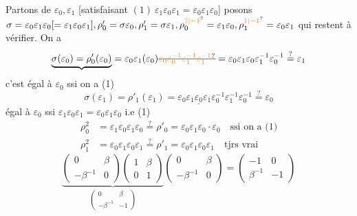 {Partons de $\varepsilon_0,\varepsilon_1$ [satisfaisant $(1)\ \boxed{\varepsilon_1\varepsilon_0\varepsilon_1=\varepsilon_0\varepsilon_1\varepsilon_0}$]
posons $\sigma=\varepsilon_0\varepsilon_1\varepsilon_0[=\varepsilon_1\varepsilon_0\varepsilon_1],\rho'_0=\sigma \varepsilon_0,\rho'_1=\sigma \varepsilon_1,\rho_0^{\unsure{?|-1}}=\varepsilon_1\varepsilon_0,\rho_1^{\unsure{1|-1}}=\varepsilon_0\varepsilon_1$
   qui restent à vérifier. On a
\[\underbrace{\sigma(\varepsilon_0)=\rho'_0(\varepsilon_0)}=\varepsilon_0\varepsilon_1(\varepsilon_0)\deleted{\unsure{\varepsilon_0\varepsilon_0^{-1}\varepsilon_1^{-1}\varepsilon_1^{-1}}}=\varepsilon_0\varepsilon_1\varepsilon_0\varepsilon_1^{-1}\varepsilon_0^{-1}\stackrel{?}{=}\varepsilon_1\]
c'est égal à $\varepsilon_0$ ssi  on a (1)
\[\sigma(\varepsilon_1)=\rho'_1(\varepsilon_1)=\varepsilon_0\underline{\varepsilon_1\varepsilon_0\varepsilon_1}\varepsilon_0^{-1}\varepsilon_1^{-1}\varepsilon_0^{-1}\stackrel{?}{=}\varepsilon_0\]
égal à $\varepsilon_0$ ssi $\varepsilon_1\varepsilon_0\varepsilon_1=\varepsilon_0\varepsilon_1\varepsilon_0$ i.e (1)}
\[\begin{aligned}
\rho_0^2&=\varepsilon_1\varepsilon_0\varepsilon_1\varepsilon_0\stackrel{?}{=}\rho'_0=\varepsilon_0\varepsilon_1\varepsilon_0\mathbin{\cdot}\varepsilon_0\quad\text{ssi on a (1)}\\
\rho_1^2&=\varepsilon_0\varepsilon_1\varepsilon_0\varepsilon_1\stackrel{?}{=}\rho'_1=\varepsilon_0\varepsilon_1\varepsilon_0\varepsilon_1\quad\text{tjrs vrai}
\end{aligned}\]
\[\underbrace{\begin{pmatrix}0&\beta\\-\beta^{-1}&0\end{pmatrix}\begin{pmatrix}1&\beta\\0&1\end{pmatrix}}_{\begin{pmatrix}0&\beta\\-\beta^{-1}&-1\end{pmatrix}}\begin{pmatrix}0&\beta\\-\beta^{-1}&0\end{pmatrix}=\begin{pmatrix}-1&0\\\beta^{-1}&-1\end{pmatrix}\]

